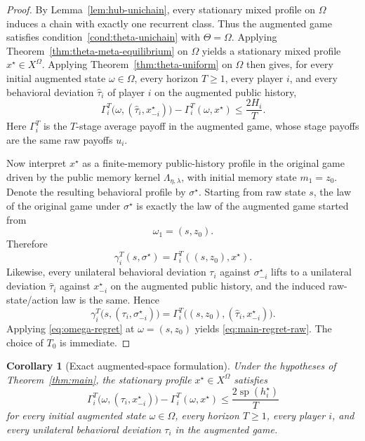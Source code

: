 \documentclass[11pt]{article}
\newtheorem{corollary}[theorem]{Corollary}
\theoremstyle{definition}
\newcommand{\1}{\mathbf{1}}
\DeclareMathOperator{\spn}{sp}
\begin{document}
\begin{proof}
By Lemma~\ref{lem:hub-unichain}, every stationary mixed profile on $\Omega$ induces a chain with exactly one recurrent class. Thus the augmented game satisfies condition~\ref{cond:theta-unichain} with $\Theta=\Omega$. Applying Theorem~\ref{thm:theta-meta-equilibrium} on $\Omega$ yields a stationary mixed profile $x^\star\in X^\Omega$. Applying Theorem~\ref{thm:theta-uniform} on $\Omega$ then gives, for every initial augmented state $\omega\in\Omega$, every horizon $T\ge1$, every player $i$, and every behavioral deviation $\widehat\tau_i$ of player $i$ on the augmented public history,
\begin{equation}\label{eq:omega-regret}
\Gamma_i^T\bigl(\omega,(\widehat\tau_i,x_{-i}^\star)\bigr)-\Gamma_i^T(\omega,x^\star)
\le \frac{2H_i}{T}.
\end{equation}
Here $\Gamma_i^T$ is the $T$-stage average payoff in the augmented game, whose stage payoffs are the same raw payoffs $u_i$.

Now interpret $x^\star$ as a finite-memory public-history profile in the original game driven by the public memory kernel $\Lambda_{\eta,\lambda}$, with initial memory state $m_1=z_0$. Denote the resulting behavioral profile by $\sigma^\star$. Starting from raw state $s$, the law of the original game under $\sigma^\star$ is exactly the law of the augmented game started from
\[
\omega_1=(s,z_0).
\]
Therefore
\[
\gamma_i^T(s,\sigma^\star)=\Gamma_i^T((s,z_0),x^\star).
\]
Likewise, every unilateral behavioral deviation $\tau_i$ against $\sigma_{-i}^\star$ lifts to a unilateral deviation $\widehat\tau_i$ against $x_{-i}^\star$ on the augmented public history, and the induced raw-state/action law is the same. Hence
\[
\gamma_i^T\bigl(s,(\tau_i,\sigma_{-i}^\star)\bigr)=\Gamma_i^T\bigl((s,z_0),(\widehat\tau_i,x_{-i}^\star)\bigr).
\]
Applying \eqref{eq:omega-regret} at $\omega=(s,z_0)$ yields \eqref{eq:main-regret-raw}. The choice of $T_0$ is immediate.
\end{proof}

\begin{corollary}[Exact augmented-space formulation]\label{cor:augmented-formulation}
Under the hypotheses of Theorem~\ref{thm:main}, the stationary profile $x^\star\in X^\Omega$ satisfies
\[
\Gamma_i^T\bigl(\omega,(\tau_i,x_{-i}^\star)\bigr)-\Gamma_i^T(\omega,x^\star)
\le \frac{2\spn(h_i^\star)}{T}
\]
for every initial augmented state $\omega\in\Omega$, every horizon $T\ge1$, every player $i$, and every unilateral behavioral deviation $\tau_i$ in the augmented game.
\end{corollary}
\end{document}
